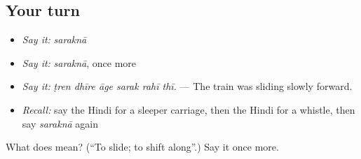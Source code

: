 \subsection*{Your turn}
\begin{itemize}
\raggedright
  \item \emph{Say it:} \emph{saraknā}
  \item \emph{Say it:} \emph{saraknā}, once more
  \item \emph{Say it:} \emph{ṭren dhīre āge sarak rahī thī.} — The train was sliding slowly forward.
  \item \emph{Recall:} say the Hindi for a sleeper carriage, then the Hindi for a whistle, then say \emph{saraknā} again
\end{itemize}

\begin{tcolorbox}[breakable,colback=teal!4,colframe=teal!35!black,title={Before you move on}]
What does  mean? (\textquotedblleft{}To slide; to shift along\textquotedblright{}.) Say it once more.
\end{tcolorbox}
